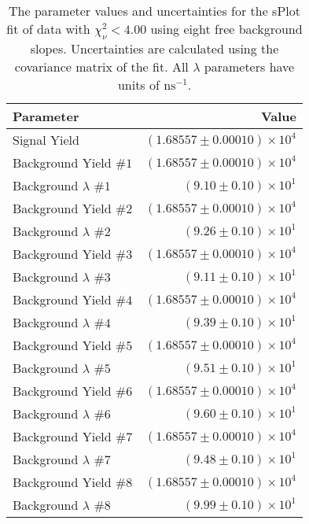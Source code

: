 
\begin{table}[ht]
    \begin{center}
        \begin{tabular}{lr}\toprule
            Parameter & Value \\\midrule
            Signal Yield & $(1.68557 \pm 0.00010) \times 10^{4}$ \\
            Background Yield $\#1$ & $(1.68557 \pm 0.00010) \times 10^{4}$ \\
            Background $\lambda$ $\#1$ & $(9.10 \pm 0.10) \times 10^{1}$ \\
            Background Yield $\#2$ & $(1.68557 \pm 0.00010) \times 10^{4}$ \\
            Background $\lambda$ $\#2$ & $(9.26 \pm 0.10) \times 10^{1}$ \\
            Background Yield $\#3$ & $(1.68557 \pm 0.00010) \times 10^{4}$ \\
            Background $\lambda$ $\#3$ & $(9.11 \pm 0.10) \times 10^{1}$ \\
            Background Yield $\#4$ & $(1.68557 \pm 0.00010) \times 10^{4}$ \\
            Background $\lambda$ $\#4$ & $(9.39 \pm 0.10) \times 10^{1}$ \\
            Background Yield $\#5$ & $(1.68557 \pm 0.00010) \times 10^{4}$ \\
            Background $\lambda$ $\#5$ & $(9.51 \pm 0.10) \times 10^{1}$ \\
            Background Yield $\#6$ & $(1.68557 \pm 0.00010) \times 10^{4}$ \\
            Background $\lambda$ $\#6$ & $(9.60 \pm 0.10) \times 10^{1}$ \\
            Background Yield $\#7$ & $(1.68557 \pm 0.00010) \times 10^{4}$ \\
            Background $\lambda$ $\#7$ & $(9.48 \pm 0.10) \times 10^{1}$ \\
            Background Yield $\#8$ & $(1.68557 \pm 0.00010) \times 10^{4}$ \\
            Background $\lambda$ $\#8$ & $(9.99 \pm 0.10) \times 10^{1}$ \\\bottomrule
        \end{tabular}
        \caption{The parameter values and uncertainties for the sPlot fit of data with $\chi^2_\nu < 4.00$ using eight free background slopes. Uncertainties are calculated using the covariance matrix of the fit. All $\lambda$ parameters have units of $\si{\nano\second}^{-1}$.}\label{tab:splot-fit-results-chisqdof-4.00-free-8}
    \end{center}
\end{table}
